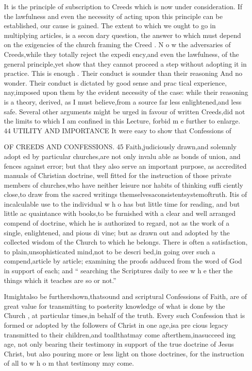 \documentclass[
]{book}
\begin{document}
It is the principle of subscription to Creeds which is now under consideration. If the
lawfulness and even the necessity of acting upon this principle can be established, our cause is gained. The extent to which we ought to go in multiplying articles, is a secon dary question, the answer to which must depend on the exigencies of the church framing the Creed . N o w the adversaries of
Creeds,while they totally reject the expedi ency,and even the lawfulness, of the general
principle,yet show that they cannot proceed a step without adopting it in practice. This
is enough . Their conduct is sounder than their reasoning And no wonder. Their
conduct is dictated by good sense and prac
tical experience, nay,imposed upon them by
the evident necessity of the case: while their
reasoning is a theory, derived, as I must
believe,from a source far less enlightened,and less safe.
Several other arguments might be urged in favour of written Creeds,did not the limits to
which I am confined in this Lecture, forbid m e further to enlarge.
44
UTILITY AND IMPORTANCE
It were easy to show that Confessions of

OF CREEDS AND CONFESSIONS. 45
Faith,judiciously drawn,and solemnly adopt ed by particular churches,are not only invalu able as bonds of union, and fences against error; but that they also serve an important purpose, as accredited manuals of Christian doctrine, well fitted for the instruction of those private members of churches,who have neither leisure nor habits of thinking suffi ciently close,to draw from the sacred writings themselvesaconsistentsystemoftruth. Itis of incalculable use to the individual w h o has
but little time for reading, and but little ac quaintance with books,to be furnished with a
clear and well arranged compend of doctrine, which he is authorized to regard, not as the
work of a single, enlightened, and pious di vine; but as drawn out and adopted by the collected wisdom of the Church to which he
belongs. There is often a satisfaction, to plain,unsophisticated mind,not to be descri
bed,in going over such a compend,article by article; examining the proofs adduced from the word of God in support of each; and `` searching the Scriptures daily to see w h e
ther the things which it teaches are so or not.''

Itmightalso be furthershown,thatsound and scriptural Confessions of Faith, are of great value for transmitting to posterity knowledge of what is done by the Church , at particular times,in behalf of the truth. Every such Confession that is formed or adopted by the followers of Christ in one age,isa pre
cious legacy transmitted to their children,and toallthatmay come afterthem,inasucceed ing age, not only bearing their testimony in support of the true doctrine of Jesus Christ,
but also pouring more or less light on those doctrines, for the instruction of all to w h o m that testimony may come.
\end{document}
